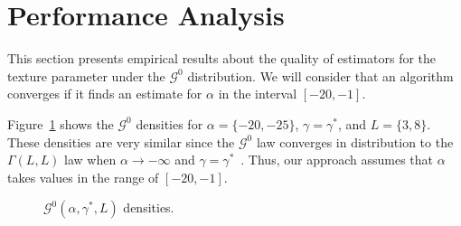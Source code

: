 \documentclass[twocolumn]{svjour3}
\begin{document}
\section{Performance Analysis}\label{simulation}

This section presents empirical results about the quality of estimators for the texture parameter under the $\mathcal G^0$ distribution. 
We will consider that an algorithm converges if it finds an estimate for $\alpha$ in the interval $[-20,-1]$.    

Figure~\ref{densidades} shows the $\mathcal{G}^0$ densities for  $\alpha=\{-20,-25\}$, $\gamma=\gamma^*$, and $L=\{3,8\}$. 
These densities are very similar since the $\mathcal{G}^0$ law converges in distribution to the $\Gamma(L,L)$ law when $\alpha \to -\infty$ and $\gamma=\gamma^*$~\cite{Frery99}. 
Thus, our approach assumes that $\alpha$ takes values in the range of $[-20,-1]$. 

\begin{figure}[hbt]
\centering
{}
\caption{$\mathcal{G}^0(\alpha,\gamma^*,L)$ densities.}\label{densidades} 
\end{figure}
\end{document}
